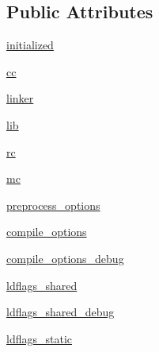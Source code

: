 \subsection*{Public Attributes}
\begin{DoxyCompactItemize}
\item 
\hyperlink{classsetuptools_1_1__distutils_1_1msvccompiler_1_1MSVCCompiler_a1f3ea32d9bdc792031686d383dd8d26b}{initialized}
\item 
\hyperlink{classsetuptools_1_1__distutils_1_1msvccompiler_1_1MSVCCompiler_aeb766b1b45f692978ba0d943231fdbbf}{cc}
\item 
\hyperlink{classsetuptools_1_1__distutils_1_1msvccompiler_1_1MSVCCompiler_a73f6cc33e6e6f4f29ad19b73319be907}{linker}
\item 
\hyperlink{classsetuptools_1_1__distutils_1_1msvccompiler_1_1MSVCCompiler_a7e2747e3c63e23f78916524512e848f5}{lib}
\item 
\hyperlink{classsetuptools_1_1__distutils_1_1msvccompiler_1_1MSVCCompiler_a0dba38ed81388591dbe18a0ab0497a3c}{rc}
\item 
\hyperlink{classsetuptools_1_1__distutils_1_1msvccompiler_1_1MSVCCompiler_a391d94d40004005db759e16a1eef0762}{mc}
\item 
\hyperlink{classsetuptools_1_1__distutils_1_1msvccompiler_1_1MSVCCompiler_a49751beea1c8369968455d59cd59c667}{preprocess\+\_\+options}
\item 
\hyperlink{classsetuptools_1_1__distutils_1_1msvccompiler_1_1MSVCCompiler_a11ce7f91e29147cfec7e6aed6102d97f}{compile\+\_\+options}
\item 
\hyperlink{classsetuptools_1_1__distutils_1_1msvccompiler_1_1MSVCCompiler_ae7e37fde72e43cbe3e0ca640a70c210d}{compile\+\_\+options\+\_\+debug}
\item 
\hyperlink{classsetuptools_1_1__distutils_1_1msvccompiler_1_1MSVCCompiler_aa64776b03a6e701c8a165346351501d4}{ldflags\+\_\+shared}
\item 
\hyperlink{classsetuptools_1_1__distutils_1_1msvccompiler_1_1MSVCCompiler_a56a8037f5fd88a3acfebf226e59785c4}{ldflags\+\_\+shared\+\_\+debug}
\item 
\hyperlink{classsetuptools_1_1__distutils_1_1msvccompiler_1_1MSVCCompiler_ab053e2c239171652205c818a7423d829}{ldflags\+\_\+static}
\end{DoxyCompactItemize}
